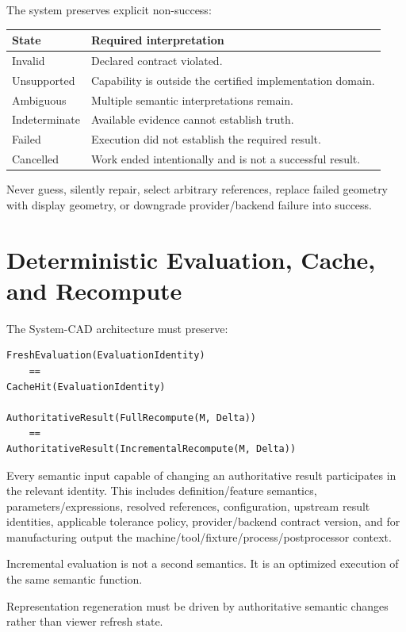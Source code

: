 \documentclass[11pt,a4paper]{report}
\begin{document}
The system preserves explicit non-success:

\begin{tabularx}{\textwidth}{@{}p{}X@{}}
\toprule
State & Required interpretation \\
\midrule
Invalid & Declared contract violated. \\
Unsupported & Capability is outside the certified implementation domain. \\
Ambiguous & Multiple semantic interpretations remain. \\
Indeterminate & Available evidence cannot establish truth. \\
Failed & Execution did not establish the required result. \\
Cancelled & Work ended intentionally and is not a successful result. \\
\bottomrule
\end{tabularx}

Never guess, silently repair, select arbitrary references, replace failed geometry with display geometry, or downgrade provider/backend failure into success.

\chapter{Deterministic Evaluation, Cache, and Recompute}

The System-CAD architecture must preserve:

\begin{lstlisting}
FreshEvaluation(EvaluationIdentity)
    ==
CacheHit(EvaluationIdentity)

AuthoritativeResult(FullRecompute(M, Delta))
    ==
AuthoritativeResult(IncrementalRecompute(M, Delta))
\end{lstlisting}

Every semantic input capable of changing an authoritative result participates in the relevant identity. This includes definition/feature semantics, parameters/expressions, resolved references, configuration, upstream result identities, applicable tolerance policy, provider/backend contract version, and for manufacturing output the machine/tool/fixture/process/postprocessor context.

Incremental evaluation is not a second semantics. It is an optimized execution of the same semantic function.

Representation regeneration must be driven by authoritative semantic changes rather than viewer refresh state.
\end{document}
